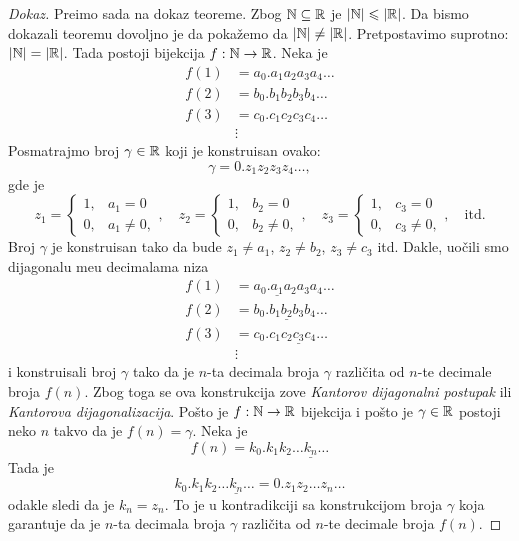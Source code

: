 \begin{proof}[Dokaz]
  Pre\dj imo sada na dokaz teoreme.
  Zbog $\mathbb{N} \subseteq \mathbb{R}$ je $|\mathbb{N}| \leqslant |\mathbb{R}|$. Da bismo dokazali teoremu dovoljno je da poka\v zemo da $|\mathbb{N}| \ne |\mathbb{R}|$.
  Pretpostavimo suprotno: $|\mathbb{N}| = |\mathbb{R}|$. Tada postoji bijekcija $f : \mathbb{N} \to \mathbb{R}$. Neka je
  \begin{align*}
    f(1) &= a_0. a_1 a_2 a_3 a_4 \ldots\\
    f(2) &= b_0. b_1 b_2 b_3 b_4 \ldots\\
    f(3) &= c_0. c_1 c_2 c_3 c_4 \ldots\\
         &\vdots
  \end{align*}
  Posmatrajmo broj $\gamma \in \mathbb{R}$ koji je konstruisan ovako:
  $$
    \gamma = 0. z_1 z_2 z_3 z_4 \ldots,
  $$
  gde je
  $$
    z_1 = \begin{cases}
      1, & a_1 = 0\\
      0, & a_1 \ne 0,
    \end{cases},
    \quad
    z_2 = \begin{cases}
      1, & b_2 = 0\\
      0, & b_2 \ne 0,
    \end{cases},
    \quad
    z_3 = \begin{cases}
      1, & c_3 = 0\\
      0, & c_3 \ne 0,
    \end{cases},
    \quad
    \text{itd.}
  $$
  Broj $\gamma$ je konstruisan tako da bude $z_1 \ne a_1$, $z_2 \ne b_2$, $z_3 \ne c_3$ itd.
  Dakle, uo\v cili smo dijagonalu me\dj u decimalama niza
  \begin{align*}
    f(1) &= a_0. \underline{a_1} a_2 a_3 a_4 \ldots\\
    f(2) &= b_0. b_1 \underline{b_2} b_3 b_4 \ldots\\
    f(3) &= c_0. c_1 c_2 \underline{c_3} c_4 \ldots\\
         &\vdots
  \end{align*}
  i konstruisali broj $\gamma$ tako da je $n$-ta decimala broja $\gamma$ razli\v cita od $n$-te decimale broja $f(n)$.
  Zbog toga se ova konstrukcija
  zove \emph{Kantorov dijagonalni postupak} ili \emph{Kantorova dijagonalizacija}.
  Po\v sto je $f : \mathbb{N} \to \mathbb{R}$ bijekcija i po\v sto je $\gamma \in \mathbb{R}$ postoji neko $n$ takvo da je
  $f(n) = \gamma$. Neka je
  $$
    f(n) = k_0. k_1 k_2 \ldots \underline{k_n} \ldots
  $$
  Tada je
  $$
    k_0. k_1 k_2 \ldots \underline{k_n} \ldots = 0. z_1 z_2 \ldots z_n \ldots
  $$
  odakle sledi da je $k_n = z_n$. To je u kontradikciji sa konstrukcijom broja $\gamma$ koja garantuje da je
  $n$-ta decimala broja $\gamma$ razli\v cita od $n$-te decimale broja $f(n)$.
\end{proof}


